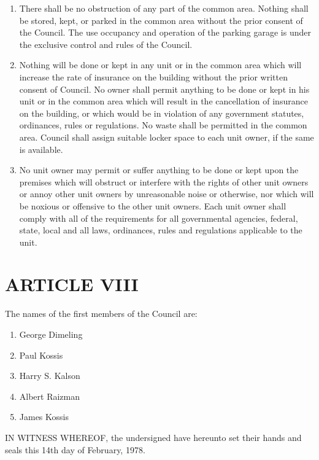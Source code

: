 \documentclass[
]{book}
\providecommand{\tightlist}{%
  \setlength{\itemsep}{0pt}\setlength{\parskip}{0pt}}
\begin{document}
\begin{enumerate}
\def\labelenumi{(\Alph{enumi})}
\item
  There shall be no obstruction of any part of the common area. Nothing shall be stored, kept, or parked in the common area without the prior consent of the Council. The use occupancy and operation of the parking garage is under the exclusive control and rules of the Council.
\item
  Nothing will be done or kept in any unit or in the common area which will increase the rate of insurance on the building without the prior written consent of Council. No owner shall permit anything to be done or kept in his unit or in the common area which will result in the cancellation of insurance on the building, or which would be in violation of any government statutes, ordinances, rules or regulations. No waste shall be permitted in the common area. Council shall assign suitable locker space to each unit owner, if the same is available.
\item
  No unit owner may permit or suffer anything to be done or kept upon the premises which will obstruct or interfere with the rights of other unit owners or annoy other unit owners by unreasonable noise or otherwise, nor which will be noxious or offensive to the other unit owners. Each unit owner shall comply with all of the requirements for all governmental agencies, federal, state, local and all laws, ordinances, rules and regulations applicable to the unit.
\end{enumerate}

\hypertarget{article-viii}{%
\section*{ARTICLE VIII}\label{article-viii}}

The names of the first members of the Council are:

\begin{enumerate}
\def\labelenumi{\arabic{enumi}.}
\tightlist
\item
  George Dimeling
\item
  Paul Kossis
\item
  Harry S. Kalson
\item
  Albert Raizman
\item
  James Kossis
\end{enumerate}

IN WITNESS WHEREOF, the undersigned have hereunto set their hands and seals this 14th day of February, 1978.
\end{document}
